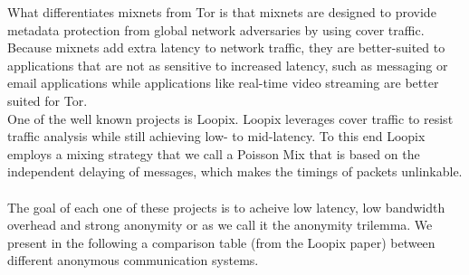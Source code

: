 What differentiates mixnets from Tor is that mixnets are designed to provide metadata protection from global network adversaries by using cover traffic. Because mixnets add extra latency to network traffic, they are better-suited to applications that are not as sensitive to increased latency, such as messaging or email applications while applications like real-time video streaming are better suited for Tor.
\\ One of the well known projects is Loopix. Loopix leverages cover traffic to resist traffic analysis while still achieving low- to mid-latency. To this end Loopix employs a mixing strategy that we call a Poisson Mix that is based on the independent delaying of messages, which makes the timings of packets unlinkable.
\\~\\ The goal of each one of these projects is to acheive low latency, low bandwidth overhead and strong anonymity or as we call it the anonymity trilemma. We present in the following a comparison table (from the Loopix paper) between different anonymous communication systems.

